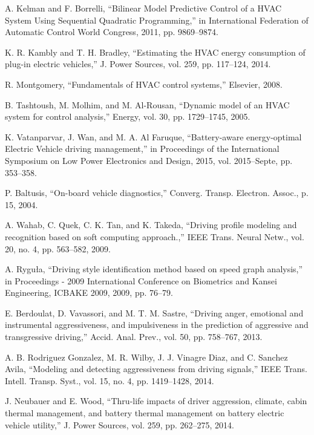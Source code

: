 
A. Kelman and F. Borrelli, ``Bilinear Model Predictive Control of a HVAC System Using Sequential Quadratic Programming,'' in International Federation of Automatic Control World Congress, 2011, pp. 9869–9874.

K. R. Kambly and T. H. Bradley, ``Estimating the HVAC energy consumption of plug-in electric vehicles,'' J. Power Sources, vol. 259, pp. 117–124, 2014.

R. Montgomery, ``Fundamentals of HVAC control systems,'' Elsevier, 2008.

B. Tashtoush, M. Molhim, and M. Al-Rousan, ``Dynamic model of an HVAC system for control analysis,'' Energy, vol. 30, pp. 1729–1745, 2005.

K. Vatanparvar, J. Wan, and M. A. Al Faruque, ``Battery-aware energy-optimal Electric Vehicle driving management,'' in Proceedings of the International Symposium on Low Power Electronics and Design, 2015, vol. 2015–Septe, pp. 353–358.

P. Baltusis, ``On-board vehicle diagnostics,'' Converg. Transp. Electron. Assoc., p. 15, 2004.

A. Wahab, C. Quek, C. K. Tan, and K. Takeda, ``Driving profile modeling and recognition based on soft computing approach.,'' IEEE Trans. Neural Netw., vol. 20, no. 4, pp. 563–582, 2009.

A. Ryguła, ``Driving style identification method based on speed graph analysis,'' in Proceedings - 2009 International Conference on Biometrics and Kansei Engineering, ICBAKE 2009, 2009, pp. 76–79.

E. Berdoulat, D. Vavassori, and M. T. M. Sastre, ``Driving anger, emotional and instrumental aggressiveness, and impulsiveness in the prediction of aggressive and transgressive driving,'' Accid. Anal. Prev., vol. 50, pp. 758–767, 2013.

A. B. Rodriguez Gonzalez, M. R. Wilby, J. J. Vinagre Diaz, and C. Sanchez Avila, ``Modeling and detecting aggressiveness from driving signals,'' IEEE Trans. Intell. Transp. Syst., vol. 15, no. 4, pp. 1419–1428, 2014.

J. Neubauer and E. Wood, ``Thru-life impacts of driver aggression, climate, cabin thermal management, and battery thermal management on battery electric vehicle utility,'' J. Power Sources, vol. 259, pp. 262–275, 2014.

